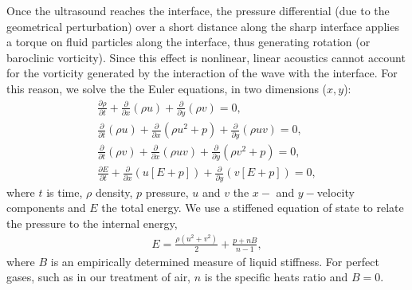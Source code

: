 Once the ultrasound reaches the interface, the pressure differential
(due to the geometrical perturbation) over a short distance along the
sharp interface applies a torque on fluid particles along the interface,
thus generating rotation (or baroclinic vorticity). Since this effect
is nonlinear, linear acoustics cannot account for the vorticity
generated by the interaction of the wave with the interface. For this
reason, we solve the the Euler equations, in two dimensions ($x,y$):
\begin{subequations} \label{eq:euler}%
  \begin{align}%
    \frac{\partial \rho}{\partial t} + \frac{\partial}{\partial x}\left(\rho u\right) + \frac{\partial}{\partial y}\left(\rho v\right) = 0,\\
    \frac{\partial}{\partial t}\left(\rho u\right) + \frac{\partial}{\partial x}\left( \rho u^2+p\right)  + \frac{\partial}{\partial y}\left( \rho uv\right) = 0,\\
    \frac{\partial}{\partial t}\left(\rho v\right) + \frac{\partial}{\partial x}\left( \rho uv\right)  + \frac{\partial}{\partial y}\left( \rho v^2+p\right) = 0,\\
    \frac{\partial E}{\partial t} + \frac{\partial}{\partial x}\left(u\left[E+p\right]\right) + \frac{\partial}{\partial y}\left(v\left[E+p\right]\right) = 0,
  \end{align}%
\end{subequations}%
where $t$ is time, $\rho$ density, $p$ pressure, $u$ and $v$ the $x-$
and $y-$velocity components and $E$ the total energy. We use a
stiffened equation of state to relate the pressure to the internal
energy,
% 
\begin{align} \label{eq:stiffened_eos}%
  E=\frac{\rho\left(u^2+v^2\right)}{2} + \frac{p+n B}{n-1},
\end{align}
% 
where $B$ is an empirically determined measure of liquid
stiffness. For perfect gases, such as in our treatment of air, $n$ is
the specific heats ratio and $B=0$.

